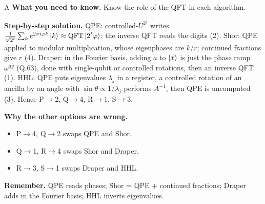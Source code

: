 \documentclass[11pt,a4paper]{article}
\newcommand{\qsep}{\par\vspace{2pt}{\color{black!15}\hrule}\vspace{4pt}}
\begin{document}
\begin{solbox}{A}
\textbf{\color{brand}What you need to know.} Know the role of the QFT in each algorithm.

\textbf{\color{brand}Step-by-step solution.} QPE: controlled-$U^{2^j}$ writes $\frac{1}{\sqrt{2^t}}\sum_k e^{2\pi i\varphi k}\ket k \approx \mathrm{QFT}\ket{2^t\varphi}$; the inverse QFT reads
the digits (2). Shor: QPE applied to modular multiplication, whose eigenphases are $k/r$; continued fractions give $r$ (4).
Draper: in the Fourier basis, adding $a$ to $\ket{x}$ is just the phase ramp $\omega^{ay}$ (Q.63), done with single-qubit or
controlled rotations, then an inverse QFT (1). HHL: QPE puts eigenvalues $\lambda_j$ in a register, a controlled rotation
of an ancilla by an angle with $\sin\theta \propto 1/\lambda_j$ performs $A^{-1}$, then QPE is uncomputed (3).
Hence P$\to$2, Q$\to$4, R$\to$1, S$\to$3.

\textbf{\color{brand}Why the other options are wrong.}
\begin{itemize}[leftmargin=2.4em, itemsep=1pt, topsep=2pt]
\item[\textbf{(B)}] P$\to$4, Q$\to$2 swaps QPE and Shor.
\item[\textbf{(C)}] Q$\to$1, R$\to$4 swaps Shor and Draper.
\item[\textbf{(D)}] R$\to$3, S$\to$1 swaps Draper and HHL.
\end{itemize}
\textbf{\color{brand}Remember.} QPE reads phases; Shor = QPE + continued fractions; Draper adds in the Fourier basis; HHL inverts eigenvalues.
\end{solbox}
\qsep
\end{document}
